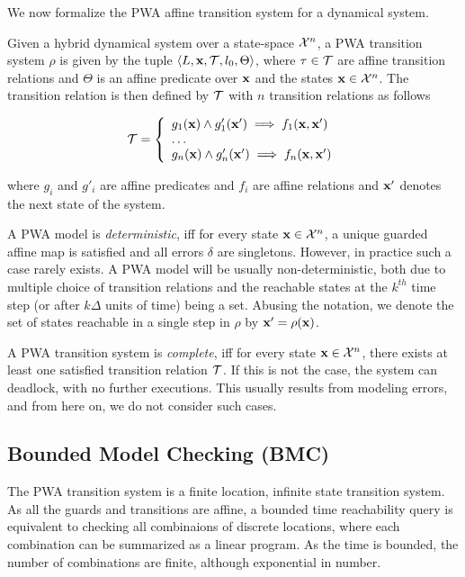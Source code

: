 We now formalize the PWA affine transition system for a dynamical system.
\begin{definition}

Given a hybrid dynamical system over a state-space
$\mathcal{X}^n$, a PWA transition system $\rho$ is given by the
tuple $\left\langle L,\mathbf{x},\mathcal{T},l_0,\Theta \right \rangle$, where $\tau \in
\mathcal{T}$ are affine transition relations and $\Theta$ is an affine
predicate over $\mathbf{x}$ and the states $\mathbf{x}\in\mathcal{X}^n$. The
transition relation is then defined by $\mathcal{T}$ with $n$ transition
relations as follows

\begin{equation}
    \mathcal{T} = \left\{
        \begin{array}{ll}
            g_1(\mathbf{x}) \land g'_1(\mathbf{x}') \implies f_1(\mathbf{x},\mathbf{x}') \\
            \ldots\\
            g_n(\mathbf{x}) \land g'_n(\mathbf{x}') \implies f_n(\mathbf{x},\mathbf{x}') \\
        \end{array}
    \right.
\end{equation}

\end{definition}

where $g_i$ and $g'_i$ are affine predicates and $f_i$ are affine
relations and $\mathbf{x}'$ denotes the next state of the system.

A PWA model is \textit{deterministic}, iff for every state
$\mathbf{x}\in\mathcal{X}^n$, a unique guarded affine map is satisfied and
all errors $\delta$ are singletons. However, in practice such a case
rarely exists. A PWA model will be usually non-deterministic, both due
to multiple choice of transition relations and the reachable states at
the $k^{th}$ time step (or after $k\Delta$ units of time) being a set.
Abusing the notation, we denote the set of states reachable in a
single step in $\rho$ by $\mathbf{x}' = \rho(\mathbf{x})$.

A PWA transition system is \textit{complete}, iff for every state
$\mathbf{x}\in\mathcal{X}^n$, there exists at least one satisfied
transition relation $\mathcal{T}$. If this is not the case, the system can
deadlock, with no further executions. This usually results from
modeling errors, and from here on, we do not consider such
cases.

\subsection{Bounded Model Checking (BMC)}
The PWA transition system is a finite location, infinite state
transition system. As all the guards and transitions are affine, a
bounded time reachability query is equivalent to checking all
combinaions of discrete locations, where each combination can be
summarized as a linear program. As the time is bounded, the number of
combinations are finite, although exponential in number.

